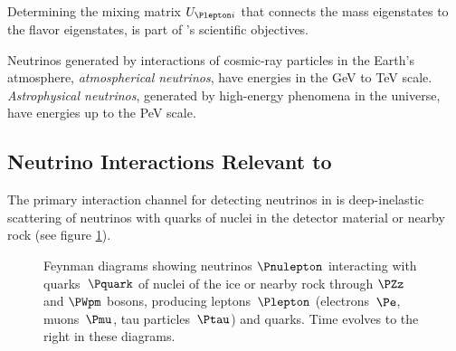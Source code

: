 Determining the mixing matrix \(U_{\Plepton i}\) that connects the mass
eigenstates to the flavor eigenstates, is part of \icecube's scientific
objectives.

Neutrinos generated by interactions of cosmic-ray particles in the
Earth's atmosphere, \textit{atmospherical neutrinos}, have energies in
the GeV to TeV scale. \textit{Astrophysical neutrinos}, generated by
high-energy phenomena in the universe, have energies up to the PeV
scale. \cite{instrumentation}

\subsection{Neutrino Interactions Relevant to \icecube}
\label{sec:neutrino_interactions}

The primary interaction channel for detecting neutrinos in \icecube is
deep-inelastic scattering of neutrinos with quarks of nuclei in the
detector material or nearby rock (see figure \ref{fig:Phei1oob}).
\cite{energyreco}

\begin{figure}[htbp]
  \centering
  \hspace{1cm}
  \caption{Feynman diagrams showing neutrinos $\Pnulepton$ interacting with quarks~$\Pquark$ of nuclei of the ice or nearby rock through $\PZz$ and $\PWpm$ bosons, producing leptons~$\Plepton$ (electrons~$\Pe$, muons~$\Pmu$, tau particles~$\Ptau$) and quarks. Time evolves to the right in these diagrams.}
  \label{fig:Phei1oob}
\end{figure}


